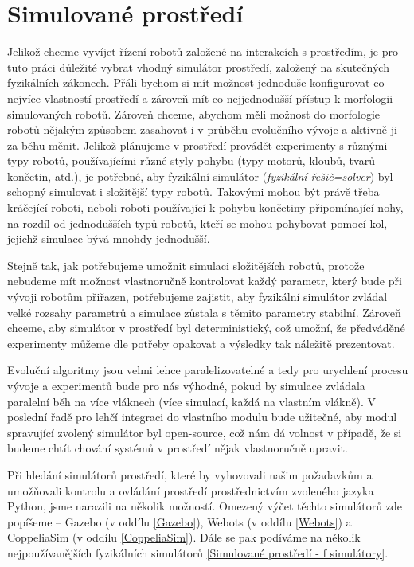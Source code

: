 \section{Simulované prostředí} \label{Simulované prostředí}

Jelikož chceme vyvíjet řízení robotů založené na interakcích s prostředím, je
pro tuto práci důležité vybrat vhodný simulátor prostředí, založený na
skutečných fyzikálních zákonech. Přáli bychom si mít možnost jednoduše
konfigurovat co nejvíce vlastností prostředí a zároveň mít co nejjednodušší
přístup k morfologii simulovaných robotů. Zároveň chceme, abychom měli možnost
do morfologie robotů nějakým způsobem zasahovat i v průběhu evolučního vývoje a
aktivně ji za běhu měnit. Jelikož plánujeme v prostředí provádět experimenty s
různými typy robotů, používajícími různé styly pohybu (typy motorů, kloubů,
tvarů končetin, atd.), je potřebné, aby fyzikální simulátor (\emph{fyzikální
řešič=solver}) byl schopný simulovat i složitější typy robotů. Takovými mohou
být právě třeba kráčející roboti, neboli roboti používající k pohybu končetiny
připomínající nohy, na rozdíl od jednodušších typů robotů, kteří se mohou
pohybovat pomocí kol, jejichž simulace bývá mnohdy jednodušší. 

Stejně tak, jak potřebujeme umožnit simulaci složitějších robotů, protože
nebudeme mít možnost vlastnoručně kontrolovat každý parametr, který bude při
vývoji robotům přiřazen, potřebujeme zajistit, aby fyzikální simulátor zvládal
velké rozsahy parametrů a simulace zůstala s těmito parametry stabilní. Zároveň
chceme, aby simulátor v prostředí byl deterministický, což umožní, že
předváděné experimenty můžeme dle potřeby opakovat a výsledky tak náležitě
prezentovat. 

Evoluční algoritmy jsou velmi lehce paralelizovatelné a tedy pro
urychlení procesu vývoje a experimentů bude pro nás výhodné, pokud by simulace
zvládala paralelní běh na více vláknech (více simulací, každá na vlastním
vlákně). V poslední řadě pro lehčí integraci do vlastního modulu bude užitečné,
aby modul spravující zvolený simulátor byl open-source, což nám dá volnost v
případě, že si budeme chtít chování systémů v prostředí nějak vlastnoručně
upravit.

Při hledání simulátorů prostředí, které by vyhovovali našim požadavkům a
umožňovali kontrolu a ovládání prostředí prostřednictvím zvoleného jazyka
Python, jsme narazili na několik možností. Omezený výčet těchto simulátorů zde
popíšeme -- Gazebo (v oddílu \ref{Gazebo}), Webots (v oddílu \ref{Webots}) a
CoppeliaSim (v oddílu \ref{CoppeliaSim}). Dále se pak podíváme na několik
nejpoužívanějších fyzikálních simulátorů \ref{Simulované prostředí - f
simulátory}.

